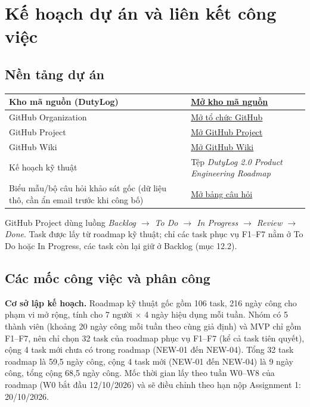 \section{Kế hoạch dự án và liên kết công việc}

\subsection{Nền tảng dự án}
\begin{tabularx}{\textwidth}{|>{\raggedright\arraybackslash}p{}|X|}
\hline
Kho mã nguồn (DutyLog) & \href{https://github.com/Big-Data-Club/BDCHub---DutyLog}{Mở kho mã nguồn} \\ \hline
GitHub Organization & \href{https://github.com/Big-Data-Club}{Mở tổ chức GitHub} \\ \hline
GitHub Project & \href{https://github.com/orgs/Big-Data-Club/projects/3}{Mở GitHub Project} \\ \hline
GitHub Wiki & \href{https://github.com/Big-Data-Club/BDCHub---DutyLog/wiki}{Mở GitHub Wiki} \\ \hline
Kế hoạch kỹ thuật & Tệp \emph{DutyLog 2.0 Product Engineering Roadmap} \\ \hline
Biểu mẫu/bộ câu hỏi khảo sát gốc \newline (dữ liệu thô, cần ẩn email trước khi công bố) & \href{https://docs.google.com/spreadsheets/d/1R5b7StzAAhT9WhOII3t3W2ZHKKUwrysQPayB1g6tjMU/edit?gid=1886321484\#gid=1886321484}{Mở bảng câu hỏi} \\ \hline
\end{tabularx}\par

\medskip
GitHub Project dùng luồng \textit{Backlog $\rightarrow$ To Do $\rightarrow$ In Progress $\rightarrow$ Review $\rightarrow$ Done}. Task được lấy từ roadmap kỹ thuật; chỉ các task phục vụ F1--F7 nằm ở To Do hoặc In Progress, các task còn lại giữ ở Backlog (mục 12.2).

\subsection{Các mốc công việc và phân công}

\textbf{Cơ sở lập kế hoạch.} Roadmap kỹ thuật gốc gồm 106 task, 216 ngày công cho phạm vi mở rộng, tính cho 7 người $\times$ 4 ngày hiệu dụng mỗi tuần. Nhóm có 5 thành viên (khoảng 20 ngày công mỗi tuần theo cùng giả định) và MVP chỉ gồm F1--F7, nên chỉ chọn 32 task của roadmap phục vụ F1--F7 (kể cả task tiên quyết), cộng 4 task mới chưa có trong roadmap (NEW-01 đến NEW-04). Tổng 32 task roadmap là 59,5 ngày công, cộng 4 task mới (NEW-01 đến NEW-04) là 9 ngày công, tổng cộng 68,5 ngày công. Mốc thời gian lấy theo tuần W0--W8 của roadmap (W0 bắt đầu 12/10/2026) và sẽ điều chỉnh theo hạn nộp Assignment 1: 20/10/2026.

